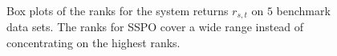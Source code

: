 \documentclass[twoside,11pt]{article}
\begin{document}
\begin{figure}[!htb]
	\centering
		\\
	\caption{Box plots of the ranks for the system returns $r_{s,t}$ on $5$ benchmark data sets. The ranks for SSPO cover a wide range instead of concentrating on the highest ranks.}
	\label{fig:boxplotrank}
\end{figure}
\end{document}
